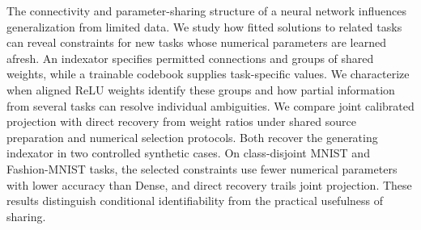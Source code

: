 The connectivity and parameter-sharing structure of a neural network
influences generalization from limited data. We study how fitted
solutions to related tasks can reveal constraints for new tasks whose
numerical parameters are learned afresh. An indexator specifies
permitted connections and groups of shared weights, while a trainable
codebook supplies task-specific values. We characterize when aligned
ReLU weights identify these groups and how partial information from
several tasks can resolve individual ambiguities. We compare joint
calibrated projection with direct recovery from weight ratios under
shared source preparation and numerical selection protocols. Both
recover the generating indexator in two controlled synthetic cases.
On class-disjoint MNIST and Fashion-MNIST tasks, the selected constraints
use fewer numerical parameters with lower accuracy than Dense, and
direct recovery trails joint projection. These results distinguish
conditional identifiability from the practical usefulness of sharing.
